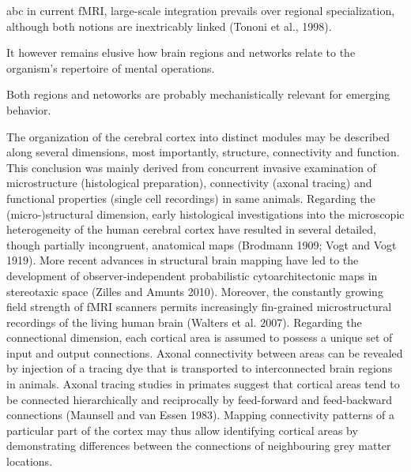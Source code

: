 \documentclass{article} %
\begin{document}
abc
in current fMRI,
large-scale integration prevails over regional specialization,
although both notions are inextricably linked (Tononi et al., 1998).

It however remains elusive how brain regions and networks relate to
the organism's repertoire of mental operations.

Both regions and netoworks are
probably mechanistically relevant for emerging behavior.


The organization of the cerebral cortex into distinct modules may be described along several dimensions, most importantly, structure, connectivity and function. This conclusion was mainly derived from concurrent invasive examination of microstructure (histological preparation), connectivity (axonal tracing) and functional properties (single cell recordings) in same animals. 
Regarding the (micro-)structural dimension, early histological investigations into the microscopic heterogeneity of the human cerebral cortex have resulted in several detailed, though partially incongruent, anatomical maps (Brodmann 1909; Vogt and Vogt 1919). More recent advances in structural brain mapping have led to the development of observer-independent probabilistic cytoarchitectonic maps in stereotaxic space (Zilles and Amunts 2010). Moreover, the constantly growing field strength of fMRI scanners permits increasingly fin-grained microstructural recordings of the living human brain (Walters et al. 2007).
Regarding the connectional dimension, each cortical area is assumed to possess a unique set of input and output connections. Axonal connectivity between areas can be revealed by injection of a tracing dye that is transported to interconnected brain regions in animals. Axonal tracing studies in primates suggest that cortical areas tend to be connected hierarchically and reciprocally by feed-forward and feed-backward connections (Maunsell and van Essen 1983). Mapping connectivity patterns of a particular part of the cortex may thus allow identifying cortical areas by demonstrating differences between the connections of neighbouring grey matter locations.
\end{document}
